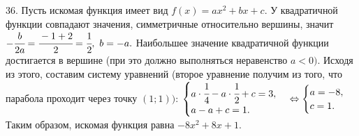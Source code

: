 36. Пусть искомая функция имеет вид $f(x)=ax^2+bx+c.$ У квадратичной функции совпадают значения, симметричные относительно вершины, значит $-\cfrac{b}{2a}=\cfrac{-1+2}{2}=\cfrac{1}{2},\ b=-a.$ Наибольшее значение квадратичной функции достигается в вершине (при это должно выполняться неравенство $a<0).$ Исходя из этого, составим систему уравнений (второе уравнение получим из того, что парабола проходит через точку $(1;1))$: $\begin{cases}
a\cdot\cfrac{1}{4}-a\cdot\cfrac{1}{2}+c=3,\\ a-a+c=1.\end{cases}\Leftrightarrow
\begin{cases}
a=-8,\\ c=1.\end{cases}$\\
Таким образом, искомая функция равна $-8x^2+8x+1.$\\
